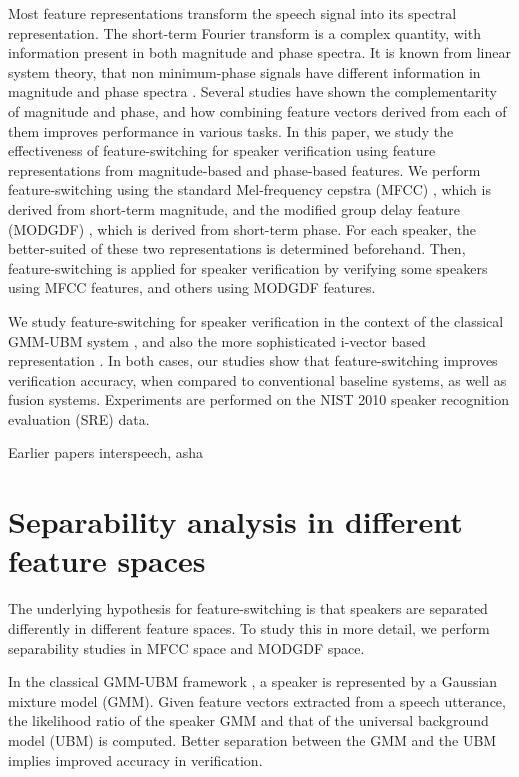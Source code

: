 \documentclass{article}
\begin{document}
Most feature representations transform the speech signal into its spectral
representation. The short-term Fourier transform is a complex quantity, with
information present in both magnitude and phase spectra. It is known from linear
system theory, that non minimum-phase signals have different information in
magnitude and phase spectra \cite{oppenheim}. Several studies \cite{ph1, ph2}
have shown the complementarity of magnitude and phase, and how combining feature
vectors derived from each of them improves performance in various tasks. In this
paper, we study the effectiveness of feature-switching for speaker verification
using feature representations from magnitude-based and phase-based features. We
perform feature-switching using the standard Mel-frequency cepstra (MFCC)
\cite{mfcc}, which
is derived from short-term magnitude, and the modified group delay feature
(MODGDF) \cite{hegdeModgdf}, which is derived from short-term phase. For each speaker, the
better-suited of these two representations is determined beforehand. Then,
feature-switching is applied for speaker verification by verifying some speakers
using MFCC features, and others using MODGDF features.

We study feature-switching for speaker verification in the context of the
classical GMM-UBM system \cite{reynoldsAdaptedGMM}, and also the more
sophisticated i-vector based representation \cite{dehak_ivector}. In both cases,
our studies show that feature-switching improves verification accuracy, when compared to
conventional baseline systems, as well as fusion systems. Experiments are performed on the
NIST 2010 speaker recognition evaluation (SRE) \cite{nist2010SRE} data.

Earlier papers interspeech, asha

\section{Separability analysis in different feature spaces}
The underlying hypothesis for feature-switching is that speakers are separated
differently in different feature spaces. To study this in more detail, we
perform separability studies in MFCC space and MODGDF space.

In the classical GMM-UBM framework \cite{reynoldsAdaptedGMM}, a speaker is
represented by a Gaussian mixture model (GMM). Given feature vectors extracted
from a speech utterance, the likelihood ratio of the speaker GMM and that of the
universal background model (UBM) is computed. Better separation between the GMM
and the UBM implies improved accuracy in verification.
\end{document}
